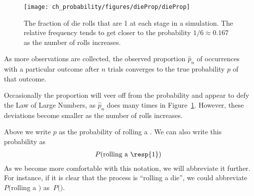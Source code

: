 \begin{figure}[ht]
\centering
\texttt{[image: ch\_probability/figures/dieProp/dieProp]}
\caption{The fraction of die rolls that are 1 at each stage in a simulation. The relative frequency tends to get closer to the probability $1/6 \approx 0.167$ as the number of rolls increases.}
\label{dieProp}
\end{figure}

\begin{termBox}{
As more observations are collected, the observed proportion $\hat{p}_n$ of occurrences with a particular outcome after $n$ trials converges to the true probability $p$ of that outcome.}
\end{termBox}

Occasionally the proportion will veer off from the probability and appear to defy the Law of Large Numbers, as $\hat{p}_n$ does many times in Figure~\ref{dieProp}. However, these deviations become smaller as the number of rolls increases.

Above we write $p$ as the probability of rolling a . We can also write this probability as
\begin{eqnarray*}
P(\text{rolling a \resp{1}})
\end{eqnarray*}
As we become more comfortable with this notation, we will abbreviate it further. For instance, if it is clear that the process is ``rolling a die'', we could abbreviate $P($rolling a $)$ as~$P($$)$.

